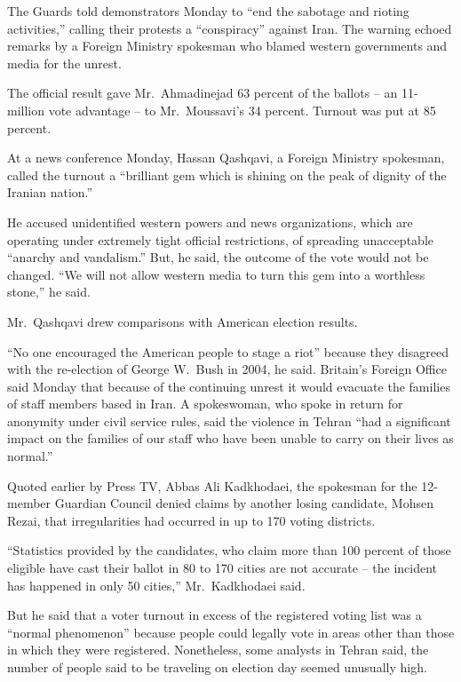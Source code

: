 ﻿\documentclass[12pt,a4paper,onecolumn]{article}
\begin{document}
The Guards told demonstrators Monday to ``end the sabotage and rioting activities,'' calling their
protests a ``conspiracy'' against Iran. The warning echoed remarks by a Foreign Ministry spokesman
who blamed western governments and media for the unrest.

The official result gave Mr.~Ahmadinejad 63 percent of the ballots -- an 11-million vote advantage
-- to Mr.~Moussavi's 34 percent. Turnout was put at 85 percent.

At a news conference Monday, Hassan Qashqavi, a Foreign Ministry spokesman, called the turnout a
``brilliant gem which is shining on the peak of dignity of the Iranian nation.''

He accused unidentified western powers and news organizations, which are operating under extremely
tight official restrictions, of spreading unacceptable ``anarchy and vandalism.'' But, he said, the
outcome of the vote would not be changed. ``We will not allow western media to turn this gem into a
worthless stone,'' he said.

Mr.~Qashqavi drew comparisons with American election results.

``No one encouraged the American people to stage a riot'' because they disagreed with the
re-election of George W.~Bush in 2004, he said. Britain's Foreign Office said Monday that because of
the continuing unrest it would evacuate the families of staff members based in Iran. A spokeswoman,
who spoke in return for anonymity under civil service rules, said the violence in Tehran ``had a
significant impact on the families of our staff who have been unable to carry on their lives as
normal.''

Quoted earlier by Press TV, Abbas Ali Kadkhodaei, the spokesman for the 12-member Guardian Council
denied claims by another losing candidate, Mohsen Rezai, that irregularities had occurred in up to
170 voting districts.

``Statistics provided by the candidates, who claim more than 100 percent of those eligible have cast
their ballot in 80 to 170 cities are not accurate -- the incident has happened in only 50 cities,''
Mr.~Kadkhodaei said.

But he said that a voter turnout in excess of the registered voting list was a ``normal phenomenon''
because people could legally vote in areas other than those in which they were registered.
Nonetheless, some analysts in Tehran said, the number of people said to be traveling on election day
seemed unusually high.
\end{document}
